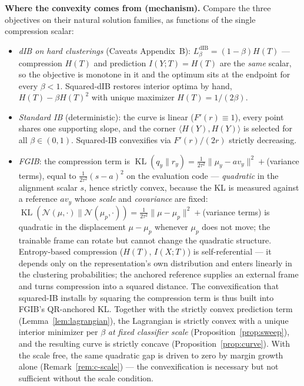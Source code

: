 \textbf{Where the convexity comes from (mechanism).}
Compare the three objectives on their natural solution families, as functions of the
single compression scalar:
\begin{itemize}
\item \emph{dIB on hard clusterings} (Caveats Appendix~B): $L^{\mathrm{dIB}}_\beta
= (1-\beta)H(T)$ --- compression $H(T)$ and prediction $I(Y;T) = H(T)$ are the
\emph{same} scalar, so the objective is monotone in it and the optimum sits at the
endpoint for every $\beta < 1$. Squared-dIB restores interior optima by hand,
$H(T) - \beta H(T)^2$ with unique maximizer $H(T) = 1/(2\beta)$.
\item \emph{Standard IB} (deterministic): the curve is linear ($F'(r) \equiv 1$), every
point shares one supporting slope, and the corner $\langle H(Y), H(Y)\rangle$ is
selected for all $\beta \in (0,1)$. Squared-IB convexifies via $F'(r)/(2r)$ strictly
decreasing.
\item \emph{FGIB}: the compression term is $\operatorname{KL}(q_y \| r_y) =
\tfrac{1}{2\tau^2}\|\mu_y - a v_y\|^2 + {}$(variance terms), equal to
$\tfrac{1}{2\tau^2}(s-a)^2$
on the evaluation code --- \emph{quadratic} in the alignment scalar $s$, hence strictly
convex, because the KL is measured against a reference $a v_y$ whose \emph{scale} and
\emph{covariance} are fixed:
$\operatorname{KL}(\mathcal{N}(\mu,\cdot)\|\mathcal{N}(\mu_p,\cdot))
= \tfrac{1}{2\tau^2}\|\mu - \mu_p\|^2 + {}$(variance terms) is quadratic in the
displacement
$\mu - \mu_p$ whenever $\mu_p$ does not move; the trainable frame can rotate but cannot
change the quadratic structure. Entropy-based compression ($H(T)$,
$I(X;T)$) is self-referential --- it depends only on the representation's own
distribution and enters linearly in the clustering probabilities; the anchored reference
supplies an external frame and turns compression into a squared distance. The
convexification that squared-IB installs by squaring the compression term is thus built
into FGIB's QR-anchored KL. Together with the strictly convex prediction term
(Lemma~\ref{lem:lagrangian}), the Lagrangian is strictly convex with a unique interior
minimizer per $\beta$ \emph{at fixed classifier scale} (Proposition~\ref{prop:sweep}),
and the resulting curve is strictly concave (Proposition~\ref{prop:curve}). With the
scale free, the same quadratic gap is driven to zero by margin growth alone
(Remark~\ref{rem:c-scale}) --- the convexification is necessary but not sufficient
without the scale condition.
\end{itemize}

